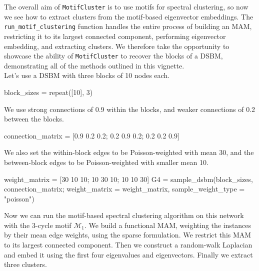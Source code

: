 \documentclass{article}
\begin{document}
The overall aim of \texttt{MotifCluster} is to use motifs for spectral clustering,
so now we see how to extract clusters from the motif-based
eigenvector embeddings.
The \texttt{run\_motif\_clustering} function handles the entire process of
building an MAM, restricting it to its largest connected component,
performing eigenvector embedding, and extracting clusters.
We therefore take the opportunity to showcase the ability of
\texttt{MotifCluster} to recover the blocks of a DSBM,
demonstrating all of the methods outlined in this vignette.\\

Let's use a DSBM with three blocks of 10 nodes each.

\begin{tcolorbox}[colback=black!5!white,colframe=black!15!white]
\begin{juliablock}
block_sizes = repeat([10], 3)
\end{juliablock}
\end{tcolorbox}

We use strong connections of 0.9 within the blocks,
and weaker connections of 0.2 between the blocks.

\begin{tcolorbox}[colback=black!5!white,colframe=black!15!white]
\begin{juliablock}
connection_matrix = [0.9 0.2 0.2; 0.2 0.9 0.2; 0.2 0.2 0.9]
\end{juliablock}
\end{tcolorbox}

We also set the within-block edges to be Poisson-weighted with
mean 30,
and the between-block edges to be Poisson-weighted with smaller
mean 10.

\begin{tcolorbox}[colback=black!5!white,colframe=black!15!white]
\begin{juliablock}
weight_matrix = [30 10 10; 10 30 10; 10 10 30]
G4 = sample_dsbm(block_sizes, connection_matrix;
                 weight_matrix = weight_matrix, sample_weight_type = "poisson")
\end{juliablock}
\end{tcolorbox}

Now we can run the motif-based spectral clustering algorithm
on this network with the 3-cycle motif $\mathcal{M}_1$.
We build a functional MAM,
weighting the instances by their mean edge weights,
using the sparse formulation.
We restrict this MAM to its largest connected component.
Then we construct a random-walk Laplacian and embed it using the
first four eigenvalues and eigenvectors.
Finally we extract three clusters.
\end{document}
